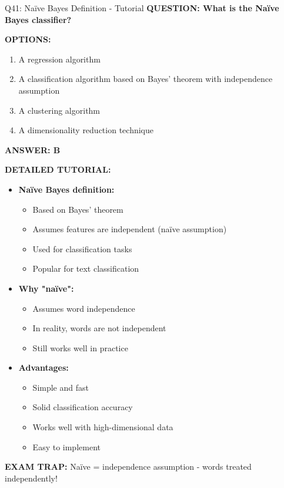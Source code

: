 \documentclass[8pt]{beamer}
\begin{document}
	
	\begin{frame}{Q41: Naïve Bayes Definition - Tutorial}
		\fontsize{6.5}{7.5}\selectfont
		\textbf{QUESTION: What is the Naïve Bayes classifier?}
		
		\vspace{0.1cm}
		\textbf{OPTIONS:}
		\begin{enumerate}
			\item A regression algorithm
			\item A classification algorithm based on Bayes' theorem with independence assumption
			\item A clustering algorithm
			\item A dimensionality reduction technique
		\end{enumerate}
		
		\vspace{0.1cm}
		\textcolor{myblue}{\textbf{ANSWER: B}}
		
		\vspace{0.1cm}
		\textbf{DETAILED TUTORIAL:}
		\begin{itemize}
			\item \textbf{Naïve Bayes definition:}
			\begin{itemize}
				\item Based on Bayes' theorem
				\item Assumes features are independent (naïve assumption)
				\item Used for classification tasks
				\item Popular for text classification
			\end{itemize}
			\item \textbf{Why "naïve":}
			\begin{itemize}
				\item Assumes word independence
				\item In reality, words are not independent
				\item Still works well in practice
			\end{itemize}
			\item \textbf{Advantages:}
			\begin{itemize}
				\item Simple and fast
				\item Solid classification accuracy
				\item Works well with high-dimensional data
				\item Easy to implement
			\end{itemize}
		\end{itemize}
		
		\textcolor{myred}{\textbf{EXAM TRAP:}} Naïve = \textcolor{myblue}{independence assumption} - words treated independently!
	\end{frame}
	
\end{document}
